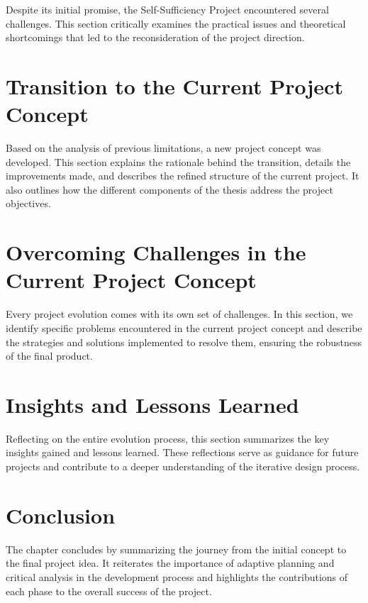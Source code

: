 Despite its initial promise, the Self-Sufficiency Project encountered several challenges. This section critically examines the practical issues and theoretical shortcomings that led to the reconsideration of the project direction.

\section{Transition to the Current Project Concept}


Based on the analysis of previous limitations, a new project concept was developed. This section explains the rationale behind the transition, details the improvements made, and describes the refined structure of the current project. It also outlines how the different components of the thesis address the project objectives.

\section{Overcoming Challenges in the Current Project Concept}


Every project evolution comes with its own set of challenges. In this section, we identify specific problems encountered in the current project concept and describe the strategies and solutions implemented to resolve them, ensuring the robustness of the final product.

\section{Insights and Lessons Learned}


Reflecting on the entire evolution process, this section summarizes the key insights gained and lessons learned. These reflections serve as guidance for future projects and contribute to a deeper understanding of the iterative design process.

\section{Conclusion}


The chapter concludes by summarizing the journey from the initial concept to the final project idea. It reiterates the importance of adaptive planning and critical analysis in the development process and highlights the contributions of each phase to the overall success of the project.


